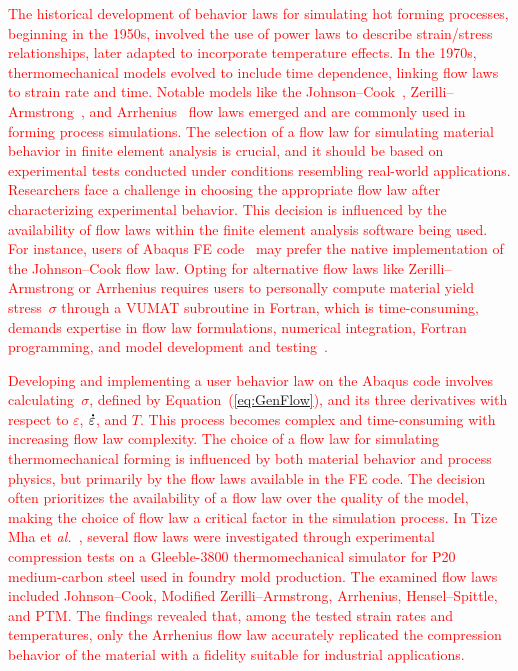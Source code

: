 \documentclass[algorithms,article,submit,pdftex,oneauthors]{Definitions/mdpi}
\makeatletter
\DeclareRobustCommand{\mdot}[1]{\accentset{\mbox{\bfseries .}}{#1}}
\DeclareRobustCommand{\eal}{et \emph{al.}\@\xspace}
\makeatother
\begin{document}
\textcolor{red}{The historical development of behavior laws for simulating hot forming processes, beginning in the 1950s, involved the use of power laws to describe strain/stress relationships, later adapted to incorporate temperature effects.
In the 1970s, thermomechanical models evolved to include time dependence, linking flow laws to strain rate and time.
Notable models like the Johnson--Cook~\cite{Johnson-1983-CMD}, Zerilli--Armstrong~\cite{Zerilli-1987-DMB}, and Arrhenius~\cite{Jonas-1969} flow laws emerged and are commonly used in forming process simulations.
The selection of a flow law for simulating material behavior in finite element analysis is crucial, and it should be based on experimental tests conducted under conditions resembling real-world applications.
Researchers face a challenge in choosing the appropriate flow law after characterizing experimental behavior.
This decision is influenced by the availability of flow laws within the finite element analysis software being used.
For instance, users of Abaqus FE code~\cite{Abaqus} may prefer the native implementation of the Johnson--Cook flow law.
Opting for alternative flow laws like Zerilli--Armstrong or Arrhenius requires users to personally compute material yield stress~$\sigma$ through a VUMAT subroutine in Fortran, which is time-consuming, demands expertise in flow law formulations, numerical integration, Fortran programming, and model development and testing~\cite{Gao-2007-FRT, Ming-2018-ERV, Liang-2022}.}

\textcolor{red}{Developing and implementing a user behavior law on the Abaqus code involves calculating~$\sigma$, defined by Equation~(\ref{eq:GenFlow}), and its three derivatives with respect to $\varepsilon$, $\mdot{\varepsilon}$, and $T$.
This process becomes complex and time-consuming with increasing flow law complexity.
The choice of a flow law for simulating thermomechanical forming is influenced by both material behavior and process physics, but primarily by the flow laws available in the FE code.
The decision often prioritizes the availability of a flow law over the quality of the model, making the choice of flow law a critical factor in the simulation process.
In Tize Mha \eal~\cite{Tize-2023-IEP}, several flow laws were investigated through experimental compression tests on a Gleeble-3800 thermomechanical simulator for P20 medium-carbon steel used in foundry mold production.
The examined flow laws included Johnson--Cook, Modified Zerilli--Armstrong, Arrhenius, Hensel--Spittle, and PTM.
The findings revealed that, among the tested strain rates and temperatures, only the Arrhenius flow law accurately replicated the compression behavior of the material with a fidelity suitable for industrial applications.}
\end{document}
